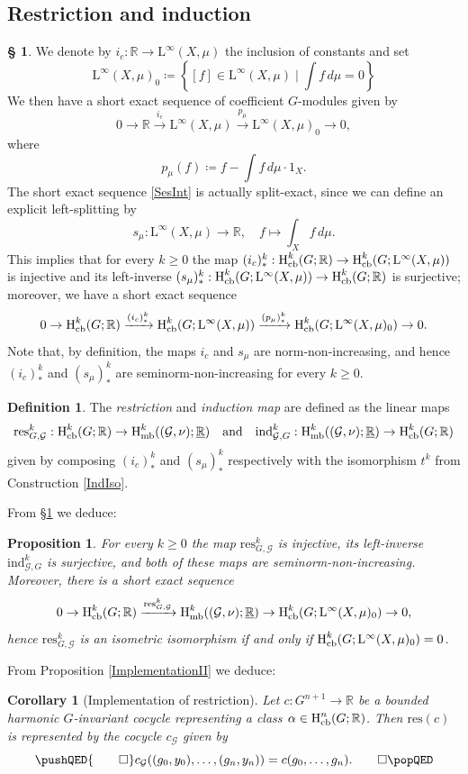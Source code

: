 \documentclass[11pt, oneside]{amsart}
\newtheorem{prop}[lemma]{Proposition}
\newtheorem{cor}[lemma]{Corollary}
\theoremstyle{definition}
\newtheorem{defn}[lemma]{Definition}
\newtheorem{no}[lemma]{\S}
\theoremstyle{remark}
\theoremstyle{TheoremNum}
\newcommand{\Hmb}{\textup{H}_{\textup{mb}}}
\newcommand{\Hcb}{\textup{H}_{\textup{cb}}}
\newcommand{\Linf}{\mathrm{L}^{\infty}}
\newcommand{\cG}{\mathcal{G}}
\newcommand{\qand}{\quad \text{and} \quad}
\newcommand{\bR}{\mathbb{R}}
\begin{document}
 \subsection{Restriction and induction}\label{sec:7.1}
 \begin{no}\label{PreResInd}
We denote by $i_c: \bR \to \Linf(X, \mu)$ the inclusion of constants and set
 \[
 \Linf(X, \mu)_0 \coloneqq  \left\{[f] \in \Linf(X, \mu) \mid \int f \, d \mu = 0 \right\}
 \]
 We then have a short exact sequence of coefficient $G$-modules given by
 \begin{equation}\label{SesInt}
 0 \to \bR \xrightarrow{i_c} \Linf(X, \mu) \xrightarrow{p_\mu} \Linf(X, \mu)_0 \to 0,
 \end{equation}
 where
 \[
 p_\mu(f) \coloneqq  f- \int f \, d\mu \cdot 1_X.
 \]
 The short exact sequence \eqref{SesInt} is actually split-exact, since we can define an explicit left-splitting by
 \[
 s_\mu:  \Linf(X, \mu) \to \bR, \quad f \mapsto \int_X f \, d \mu.
 \] 
 This implies that for every $k \geq 0$ the map $(i_c)^k_*:  \Hcb^k(G; \bR) \to  \Hcb^k(G; \Linf(X, \mu))$ is injective and its left-inverse $(s_\mu)^k_*: \Hcb^k(G; \Linf(X, \mu)) \to \Hcb^k(G; \bR)$ is surjective; moreover, we have
 a short exact sequence
 \[
 0 \to \Hcb^k(G; \bR) \xrightarrow{(i_c)^k_*} \Hcb^k(G; \Linf(X, \mu)) \xrightarrow{(p_\mu)^k_*} \Hcb^k(G; \Linf(X, \mu)_0) \to 0.
 \]
 Note that, by definition, the maps $i_c$ and $s_\mu$ are norm-non-increasing, and hence $(i_c)^k_*$ and $(s_\mu)^k_*$ are seminorm-non-increasing for every $k \geq 0$.
 \end{no}
 \begin{defn}\label{def:res} The \emph{restriction} and \emph{induction map} are defined as the linear maps
 \[
 \mathrm{res}^k_{G,\cG}: \Hcb^k(G; \bR) \to \Hmb^k((\cG, \nu); \underline{\bR}) \qand \mathrm{ind}^k_{\cG,G}: \Hmb^k((\cG, \nu); \underline{\bR}) \to  \Hcb^k(G; \bR)
 \]
 given by composing $(i_c)^k_*$ and $(s_\mu)^k_*$ respectively with the isomorphism $t^k$ from Construction \ref{IndIso}.
 \end{defn}
 From \S \ref{PreResInd} we deduce:
 \begin{prop}\label{prop:res:ind}
   For every $k \geq 0$ the map $\mathrm{res}^k_{G,\cG}$ is injective, its left-inverse $\mathrm{ind}^k_{\cG,G}$ is surjective, and both of these maps are seminorm-non-increasing.
 Moreover, there is a short exact sequence
 \[
 0 \to \Hcb^k(G; \bR) \xrightarrow{\mathrm{res}^k_{G, \cG}} \Hmb^k((\cG, \nu); \underline{\bR}) \to  \Hcb^k(G; \Linf(X, \mu)_0) \to 0,
 \]
 hence $\mathrm{res}^k_{G, \cG}$ is an isometric isomorphism if and only if $\Hcb^k(G; \Linf(X, \mu)_0) = 0$. 
 \end{prop}
 From Proposition \ref{ImplementationII} we deduce:
 \begin{cor}[Implementation of restriction]\label{ImplementRes} Let $c: G^{n+1} \to \bR$ be a bounded harmonic $G$-invariant cocycle representing a class $\alpha \in \Hcb^n(G; \bR)$. Then $\mathrm{res}(c)$ is represented by the cocycle $c_{\cG}$ given by
 \[
 \pushQED{\qed}
 c_{\cG}((g_0, y_0), \dots, (g_n, y_n)) = c(g_0, \dots, g_n).\qedhere \popQED
 \]
 \end{cor}
\end{document}
